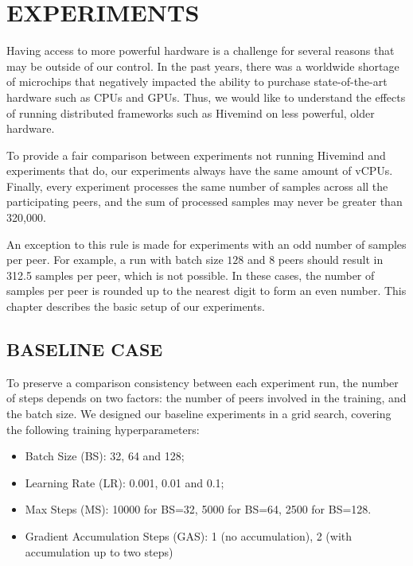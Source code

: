 \chapter{EXPERIMENTS}\label{chapter:experiments}

Having access to more powerful hardware is a challenge for several reasons that may be outside of our control.
In the past years, there was a worldwide shortage of microchips that negatively impacted the ability to purchase state-of-the-art hardware such as CPUs and GPUs.
Thus, we would like to understand the effects of running distributed frameworks such as Hivemind on less powerful, older hardware.

To provide a fair comparison between experiments not running Hivemind and experiments that do, our experiments always have the same amount of vCPUs.
Finally, every experiment processes the same number of samples across all the participating peers, and the sum of processed samples may never be greater than 320,000.

An exception to this rule is made for experiments with an odd number of samples per peer.
For example, a run with batch size $128$ and 8 peers should result in 312.5 samples per peer, which is not possible.
In these cases, the number of samples per peer is rounded up to the nearest digit to form an even number.
This chapter describes the basic setup of our experiments.

\section{BASELINE CASE}

To preserve a comparison consistency between each experiment run, the number of steps depends on two factors: the number of peers involved in the training, and the batch size.
We designed our baseline experiments in a grid search, covering the following training hyperparameters:
\begin{itemize}
    \item Batch Size (BS): 32, 64 and 128;
    \item Learning Rate (LR): 0.001, 0.01 and 0.1;
    \item Max Steps (MS): 10000 for BS=32, 5000 for BS=64, 2500 for BS=128.
    \item Gradient Accumulation Steps (GAS): 1 (no accumulation), 2 (with accumulation up to two steps)
\end{itemize}

